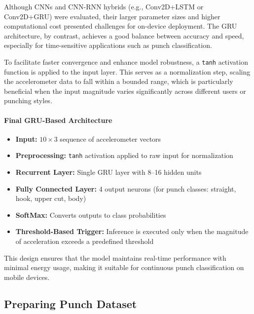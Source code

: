 \documentclass{article}
\begin{document}
    Although CNNs and CNN-RNN hybrids (e.g., Conv2D+LSTM or Conv2D+GRU) were evaluated,
    their larger parameter sizes and higher computational cost presented
    challenges for on-device deployment. The GRU architecture, by contrast, achieves
    a good balance between accuracy and speed, especially for time-sensitive
    applications such as punch classification.

    To facilitate faster convergence and enhance model robustness, a \texttt{tanh}
    activation function is applied to the input layer. This serves as a normalization
    step, scaling the accelerometer data to fall within a bounded range, which is
    particularly beneficial when the input magnitude varies significantly across
    different users or punching styles.

    \paragraph{Final GRU-Based Architecture}
    \begin{itemize}
        \item \textbf{Input:} $10 \times 3$ sequence of accelerometer vectors

        \item \textbf{Preprocessing:} \texttt{tanh} activation applied to raw input
            for normalization

        \item \textbf{Recurrent Layer:} Single GRU layer with 8--16 hidden units

        \item \textbf{Fully Connected Layer:} 4 output neurons (for punch classes:
            straight, hook, upper cut, body)

        \item \textbf{SoftMax:} Converts outputs to class probabilities

        \item \textbf{Threshold-Based Trigger:} Inference is executed only when
            the magnitude of acceleration exceeds a predefined threshold
    \end{itemize}

    This design ensures that the model maintains real-time performance with minimal
    energy usage, making it suitable for continuous punch classification on
    mobile devices.

    \subsection{Preparing Punch Dataset}
\end{document}
